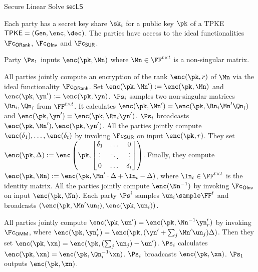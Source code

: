 \begin{algorithm}
\caption{Secure Linear Solve $\mathsf{secLS}$}
\label{pro:secLS}
\begin{algorithmic}[1]
\REQUIRE Each party has a secret key share $\sk_i$ for a public key $\pk$ of a TPKE $\mathsf{TPKE}=(\mathsf{Gen},\enc,\dec)$. The parties have access to the  ideal functionalities $\Fc_\mathsf{ORank}$, $\Fc_\mathsf{OInv}$ and $\Fc_\mathsf{SUR}$.

\ENSURE Party $\Ps_1$ inputs $\enc(\pk,\Mn)$ where $\Mn\in\FF^{t\times t}$ is a non-singular matrix.

\STATE All parties jointly compute an encryption of the  rank $\enc(\pk,r)$ of $\Mn$ via the ideal functionality $\Fc_\mathsf{ORank}$.%
\STATE Set $\enc(\pk,\Mn'):=\enc(\pk,\Mn)$ and $\enc(\pk,\yn'):=\enc(\pk,\yn)$.
    \STATE $\Ps_i$ samples two non-singular matrices $\Rn_i,\Qn_i$ from $\FF^{t\times t}$. It calculates $\enc(\pk,\Mn')=\enc(\pk,\Rn_i\Mn' \Qn_i)$ and $\enc(\pk,\yn')=\enc(\pk,\Rn_i\yn')$.  $\Ps_i$ broadcasts $\enc(\pk,\Mn'),\enc(\pk,\yn')$. %
\ENDFOR
\STATE All the parties jointly compute  $\enc(\delta_1),\dots,\enc(\delta_t)$ by invoking $\Fc_\mathsf{SUR}$ on input $\enc(\pk,r)$. They set $\enc(\pk,\Delta) := \enc\left(\pk,\begin{bmatrix}
                                    \delta_1&\dots&0\\
                                    \vdots&\ddots&\vdots\\
                                    0&\dots&\delta_t
                                \end{bmatrix}\right)$.
     Finally, they compute $\enc(\pk,\Nn):=\enc(\pk,\Mn'\cdot \Delta+\In_t-\Delta)$, where $\In_t\in\FF^{t\times t}$ is the identity matrix.
\STATE All the parties jointly compute $\enc(\Nn^{-1})$ by invoking $\Fc_\mathsf{OInv}$ on input $\enc(\pk,\Nn)$.
\STATE Each party $\Ps^i$ samples $\un_i\sample \FF^t$ and broadcasts $(\enc(\pk,\Mn'\un_i), \enc(\pk,\un_i))$.
     
\STATE All parties jointly compute $\enc(\pk,\un')=\enc(\pk,\Nn^{-1}\yn'_r)$ by invoking $\Fc_\mathsf{OMM}$, where $\enc(\pk,\yn'_r) = \enc(\pk,(\yn'+\sum_j \Mn'\un_j)\Delta)$. Then they set $\enc(\pk,\xn)=\enc(\pk,(\sum_j\un_j)-\un')$.
    \STATE $\Ps_i$ calculates $\enc(\pk,\xn)=\enc(\pk,\Qn_i^{-1}\xn)$. $\Ps_i$ broadcasts $\enc(\pk,\xn)$.
\ENDFOR
\STATE $\Ps_1$ outputs $\enc(\pk,\xn)$.
\end{algorithmic}
\end{algorithm}
 
